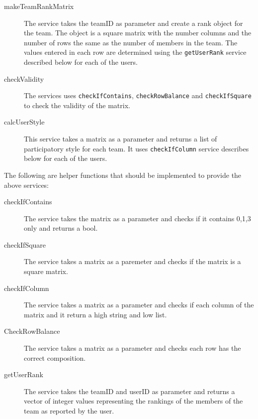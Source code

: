 \begin{description}

\item[makeTeamRankMatrix] The service takes the teamID as parameter and create a rank object for the team. The object is a square matrix with the number columns and the number of rows the same as the number of members in the team. The values entered in each row are determined using the \texttt{getUserRank} service described below for each of the users. 



\item[checkValidity] The services uses \texttt{checkIfContains}, \texttt{checkRowBalance} and \texttt{checkIfSquare} to check the validity of the matrix.



\item[calcUserStyle] This service takes a matrix as a parameter and returns a list of participatory style for each team. It uses \texttt{checkIfColumn} service describes below for each of the users.



 


\end{description}  
The following are helper functions that should be implemented to provide the above services:
\begin{description}
	
	\item[checkIfContains] The service takes the matrix as a parameter and checks if it contains 0,1,3 only and returns a bool.
	
	\item[checkIfSquare] The service takes a matrix as a paremeter and checks if the matrix is a square matrix.
	
	\item[checkIfColumn] The service takes a matrix as a parameter and checks if each column of the matrix and it return a high string and low list.
	
	\item[CheckRowBalance] The service takes a matrix as a parameter and checks each row has the correct composition.
	
	\item[getUserRank] The service takes the teamID and userID as parameter and returns a vector of integer values representing the rankings of the members of the team as reported by the user. 
	
	
	
\end{description}









